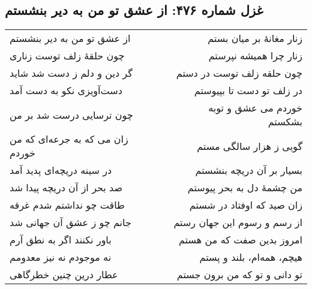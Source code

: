 \begin{center}
\section*{غزل شماره ۴۷۶: از عشق تو من به دیر بنشستم}
\label{sec:476}
\begin{longtable}{l p{0.5cm} r}
از عشق تو من به دیر بنشستم
&&
زنار مغانهٔ بر میان بستم
\\
چون حلقهٔ زلف توست زناری
&&
زنار چرا همیشه نپرستم
\\
گر دین و دلم ز دست شد شاید
&&
چون حلقه زلف توست در دستم
\\
دست‌آویزی نکو به دست آمد
&&
در زلف تو دست تا بپیوستم
\\
چون ترسایی درست شد بر من
&&
خوردم می عشق و توبه بشکستم
\\
زان می که به جرعه‌ای که من خوردم
&&
گویی ز هزار سالگی مستم
\\
در سینه دریچه‌ای پدید آمد
&&
بسیار بر آن دریچه بنشستم
\\
صد بحر از آن دریچه پیدا شد
&&
من چشمهٔ دل به بحر پیوستم
\\
طاقت چو نداشتم شدم غرقه
&&
زان صید که اوفتاد در شستم
\\
جانم چو ز عشق آن جهانی شد
&&
از رسم و رسوم این جهان رستم
\\
باور نکنند اگر به نطق آرم
&&
امروز بدین صفت که من هستم
\\
نه موجودم نه نیز معدومم
&&
هیچم، همه‌ام، بلند و پستم
\\
عطار درین چنین خطرگاهی
&&
تو دانی و تو که من برون جستم
\\
\end{longtable}
\end{center}
